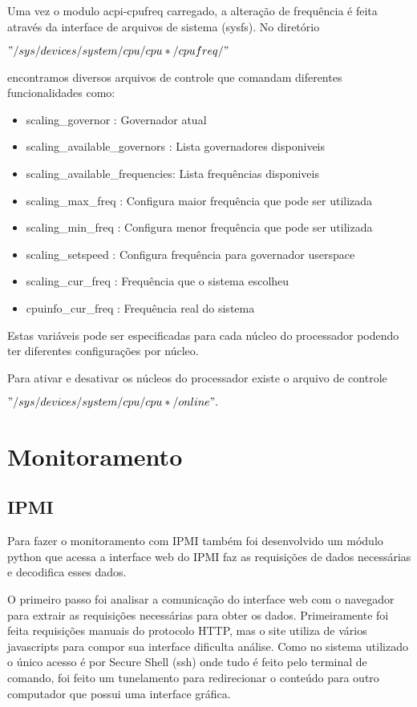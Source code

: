 Uma vez o modulo acpi-cpufreq carregado, a alteração de frequência é feita através da interface de arquivos de sistema (sysfs). No diretório

$"/sys/devices/system/cpu/cpu*/cpufreq/"$

encontramos diversos arquivos de controle que comandam diferentes funcionalidades como:

\begin{itemize}
	\item scaling\_governor : Governador atual
	\item scaling\_available\_governors : Lista governadores disponiveis
	\item scaling\_available\_frequencies: Lista frequências disponiveis
	\item scaling\_max\_freq : Configura maior frequência que pode ser utilizada
	\item scaling\_min\_freq : Configura menor frequência que pode ser utilizada
	\item scaling\_setspeed : Configura frequência para governador userspace 
	\item scaling\_cur\_freq : Frequência que o sistema escolheu
	\item cpuinfo\_cur\_freq : Frequência real do sistema
\end{itemize}

Estas variáveis pode ser especificadas para cada núcleo do processador podendo ter diferentes configurações por núcleo. 

Para ativar e desativar os núcleos do processador existe o arquivo de controle

$"/sys/devices/system/cpu/cpu*/online".$

\section{Monitoramento}

\subsection{IPMI}
Para fazer o monitoramento com IPMI também foi desenvolvido um módulo python que acessa a interface web do IPMI faz as requisições de dados necessárias e decodifica esses dados.

O primeiro passo foi analisar a comunicação do interface web com o navegador para extrair as requisições necessárias para obter os dados. Primeiramente foi feita requisições manuais do protocolo HTTP, mas o site utiliza de vários javascripts para compor sua interface dificulta análise. Como no sistema utilizado o único acesso é por Secure Shell (ssh) onde tudo é feito pelo terminal de comando, foi feito um tunelamento para redirecionar o conteúdo para outro computador que possui uma interface gráfica.

